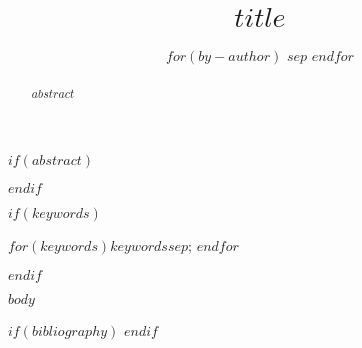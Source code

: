 \documentclass[
    a4paper,
    man,
    floatsintext
]{glossaPX2}
\title[$shorttitle$]{$title$}
\author[]{
$for(by-author)$
\spauthor{
$by-author.name.literal$\\
$if(by-author.affiliations)$
  $for(by-author.affiliations)$
    \institute{$by-author.affiliations.name$}\\
  $endfor$
$endif$
$if(by-author.email)$
  \small{$by-author.email$\\}
$endif$
$if(by-author.orcid)$
  \small{ORCID: $by-author.orcid$}
$endif$
}
$sep$ \AND
$endfor$
}
\begin{document}
\maketitle

$if(abstract)$
\begin{abstract}
$abstract$
\end{abstract}
$endif$

$if(keywords)$
\begin{keywords}
$for(keywords)$$keywords$$sep$; $endfor$
\end{keywords}
$endif$

$body$

$if(bibliography)$
\printbibliography
$endif$
\end{document}
